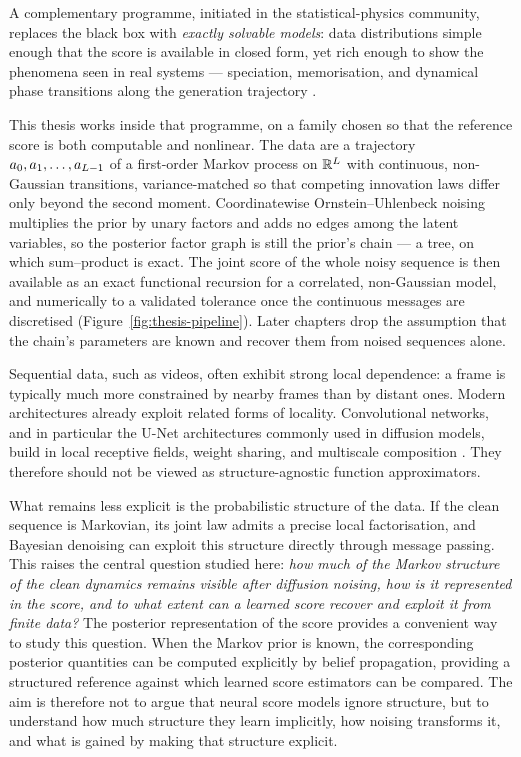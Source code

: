 A complementary programme, initiated in the statistical-physics community,
replaces the black box with \emph{exactly solvable models}: data distributions
simple enough that the score is available in closed form, yet rich enough to
show the phenomena seen in real systems --- speciation, memorisation, and
dynamical phase transitions along the generation trajectory
\citep{biroli2023generative, biroli2024dynamical, raya2023spontaneous,
ghio2024sampling, achilli2026speciation}.

This thesis works inside that programme, on a family chosen so that the
reference score is both computable and nonlinear. The data are a trajectory
$a_0, a_1, \dots, a_{L-1}$ of a first-order Markov process on $\mathbb{R}^{L}$
with continuous, non-Gaussian transitions, variance-matched so that competing
innovation laws differ only beyond the second moment. Coordinatewise
Ornstein--Uhlenbeck noising multiplies the prior by unary factors and adds no
edges among the latent variables, so the posterior factor graph is still the
prior's chain --- a tree, on which sum--product is exact. The joint score of the
whole noisy sequence is then available as an exact functional recursion for a
correlated, non-Gaussian model, and numerically to a validated tolerance once
the continuous messages are discretised (Figure~\ref{fig:thesis-pipeline}).
Later chapters drop the assumption that the chain's parameters are known and
recover them from noised sequences alone.

Sequential data, such as videos, often exhibit strong local dependence: a frame is
typically much more constrained by nearby frames than by distant ones. Modern
architectures already exploit related forms of locality. Convolutional networks, and
in particular the U-Net architectures commonly used in diffusion models, build in
local receptive fields, weight sharing, and multiscale composition
\citep{krizhevsky2012imagenet,lecun2015deep}. They therefore should not be viewed
as structure-agnostic function approximators.

What remains less explicit is the probabilistic structure of the data. If the clean
sequence is Markovian, its joint law admits a precise local factorisation, and Bayesian
denoising can exploit this structure directly through message passing. This raises the
central question studied here: \emph{how much of the Markov structure of the clean
dynamics remains visible after diffusion noising, how is it represented in the score,
and to what extent can a learned score recover and exploit it from finite data?}
The posterior representation of the score provides a convenient way to study this
question. When the Markov prior is known, the corresponding posterior quantities can
be computed explicitly by belief propagation, providing a structured reference against
which learned score estimators can be compared. The aim is therefore not to argue that
neural score models ignore structure, but to understand how much structure they learn
implicitly, how noising transforms it, and what is gained by making that structure
explicit.

